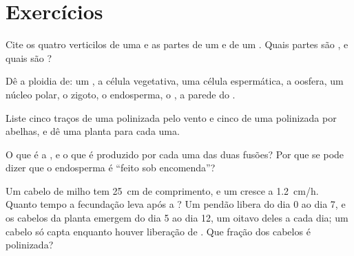 \section{Exercícios}

\begin{exercise}[$\star$]\label{exo:b2:angiosperm-reproduction:1}
Cite os quatro verticilos de uma  e as partes de um  e de um
. Quais partes são  , e quais são 
?
\end{exercise}

\begin{exercise}[$\star$]\label{exo:b2:angiosperm-reproduction:2}
Dê a ploidia de: um , a célula vegetativa, uma célula
espermática, a oosfera, um núcleo polar, o zigoto, o endosperma, o
, a parede do .
\end{exercise}

\begin{exercise}[$\star$]\label{exo:b2:angiosperm-reproduction:3}
Liste cinco traços de uma  polinizada pelo vento e cinco de uma
 polinizada por abelhas, e dê uma planta para cada uma.
\end{exercise}

\begin{exercise}[$\star$]\label{exo:b2:angiosperm-reproduction:4}
O que é a , e o que é produzido por cada uma das duas
fusões? Por que se pode dizer que o endosperma é ``feito sob
encomenda''?
\end{exercise}

\begin{exercise}[$\star\star$]\label{exo:b2:angiosperm-reproduction:5}
Um cabelo de milho tem \qty{25}{cm} de comprimento, e um 
cresce a \qty{1.2}{cm/h}. Quanto tempo a fecundação leva após a
? Um pendão libera  do dia 0 ao dia 7, e os cabelos da
planta emergem do dia 5 ao dia 12, um oitavo deles a cada dia; um
cabelo só capta  enquanto houver liberação de . Que fração
dos cabelos é polinizada?
\end{exercise}

